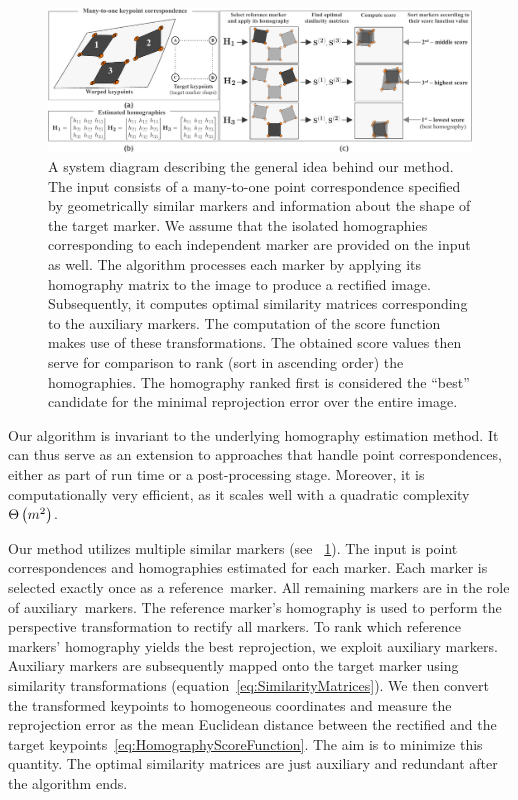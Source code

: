 \begin{figure}[t]
    \centerline{\includegraphics[width=\linewidth]{figures/homography/system_diagram.pdf}}
    \caption[Homography ranking system diagram]{A system diagram describing the general idea behind our method.  The input consists of a many-to-one point correspondence specified by geometrically similar markers and information about the shape of the target marker.  We assume that the isolated homographies corresponding to each independent marker are provided on the input as well.  The algorithm processes each marker by applying its homography matrix to the image to produce a rectified image. Subsequently, it computes optimal similarity matrices corresponding to the auxiliary markers. The computation of the score function makes use of these transformations. The obtained score values then serve for comparison to rank (sort in ascending order) the homographies. The homography ranked first is considered the ``best'' candidate for the minimal reprojection error over the entire image.}
    \label{fig:HomographySystemDiagram}
\end{figure}

Our algorithm is invariant to the underlying homography estimation method. It can thus serve as an extension to approaches that handle point correspondences, either as part of run time or a post-processing stage. Moreover, it is computationally very efficient, as it scales well with a quadratic complexity ${\Theta} \left( m^2 \right)$.

Our method utilizes multiple similar markers (see \figstr{}~\ref{fig:HomographySystemDiagram}). The input is point correspondences and homographies estimated for each marker. Each marker is selected exactly once as a \mbox{reference marker}. All remaining markers are in the role of \mbox{auxiliary markers}. The reference marker's homography is used to perform the perspective transformation to rectify all markers. To rank which reference markers' homography yields the best reprojection, we exploit auxiliary markers. Auxiliary markers are subsequently mapped onto the target marker using similarity transformations (equation~\eqref{eq:SimilarityMatrices}). We then convert the transformed keypoints to homogeneous coordinates and measure the reprojection error as the mean Euclidean distance between the rectified and the target keypoints~\eqref{eq:HomographyScoreFunction}. The aim is to minimize this quantity. The optimal similarity matrices are just auxiliary and redundant after the algorithm ends.

